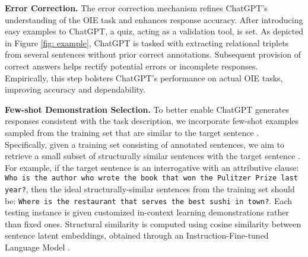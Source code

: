 \documentclass{article}
\begin{document}
\noindent\textbf{Error Correction.} The error correction mechanism refines ChatGPT's understanding of the OIE task and enhances response accuracy. After introducing easy examples to ChatGPT, a quiz, acting as a validation tool, is set. As depicted in Figure \ref{fig: example}, ChatGPT is tasked with extracting relational triplets from several sentences without prior correct annotations. Subsequent provision of correct answers helps rectify potential errors or incomplete responses. Empirically, this step bolsters ChatGPT's performance on actual OIE tasks, improving accuracy and dependability.

\noindent\textbf{Few-shot Demonstration Selection.} To better enable ChatGPT generates responses consistent with the task description, we incorporate few-shot examples sampled from the training set that are similar to the target sentence . Specifically, given a training set  consisting of annotated sentences, we aim to retrieve a small subset  of structurally similar sentences with the target sentence . For example, if the target sentence  is an interrogative with an attributive clause: \texttt{Who is the author who wrote the book that won the Pulitzer Prize last year?}, then the ideal structurally-similar sentences from the training set should be: \texttt{Where is the restaurant that serves the best sushi in town?}. Each testing instance is given customized in-context learning demonstrations rather than fixed ones. Structural similarity is computed using cosine similarity between sentence latent embeddings, obtained through an Instruction-Fine-tuned Language Model \cite{su2022one}.
\end{document}
